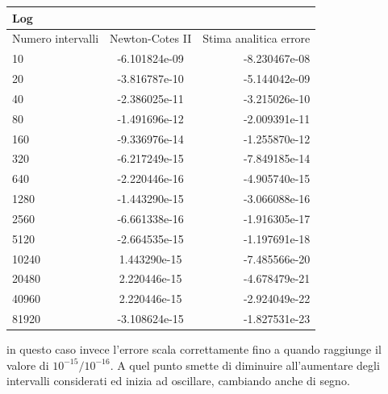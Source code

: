   \begin{center}
  \begin{longtable}[h]{lcr}
\toprule
Log & & \\
\midrule
Numero intervalli & Newton-Cotes II & Stima analitica errore  \\
\midrule
10 & 	  -6.101824e-09  	 & -8.230467e-08 \\  
20 & 	  -3.816787e-10  	 & -5.144042e-09 \\  
40 & 	  -2.386025e-11  	 & -3.215026e-10 \\  
80 & 	  -1.491696e-12  	 & -2.009391e-11 \\  
160 & 	  -9.336976e-14  	 & -1.255870e-12 \\  
320 & 	  -6.217249e-15  	 & -7.849185e-14 \\  
640 & 	  -2.220446e-16  	 & -4.905740e-15 \\  
1280 & 	  -1.443290e-15  	 & -3.066088e-16 \\  
2560 & 	  -6.661338e-16 	 & -1.916305e-17 \\  
5120 & 	  -2.664535e-15 	 & -1.197691e-18 \\  
10240 &  1.443290e-15  	 & -7.485566e-20 \\  
20480 &  2.220446e-15  	 & -4.678479e-21 \\  
40960 &  2.220446e-15  	 & -2.924049e-22 \\  
81920 &  -3.108624e-15   	&-1.827531e-23 \\  
\bottomrule
\end{longtable}
\end{center}
in questo caso invece l'errore scala correttamente fino a quando raggiunge il valore di $ 10^{-15}/ 10^{-16}$. A quel punto smette di
diminuire all'aumentare degli intervalli considerati ed inizia ad oscillare, cambiando anche di segno.

